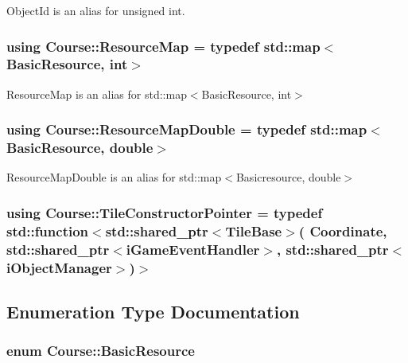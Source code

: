 Object\-Id is an alias for unsigned int. 

\hypertarget{namespaceCourse_ab9a46ed9cd00485e318e5731ea2f78d9}{
\subsubsection[{Resource\-Map}]{\setlength{\rightskip}{0pt plus 5cm}using {\bf Course\-::\-Resource\-Map} = typedef std\-::map$<${\bf Basic\-Resource}, int$>$}}\label{namespaceCourse_ab9a46ed9cd00485e318e5731ea2f78d9}


Resource\-Map is an alias for std\-::map$<$\-Basic\-Resource, int$>$ 

\hypertarget{namespaceCourse_a0b96bae1a664dde34efbb1b42dea615e}{
\subsubsection[{Resource\-Map\-Double}]{\setlength{\rightskip}{0pt plus 5cm}using {\bf Course\-::\-Resource\-Map\-Double} = typedef std\-::map$<${\bf Basic\-Resource}, double$>$}}\label{namespaceCourse_a0b96bae1a664dde34efbb1b42dea615e}


Resource\-Map\-Double is an alias for std\-::map$<$\-Basicresource, double$>$ 

\hypertarget{namespaceCourse_acf802ffd79a9573eb8afca22ae1f8a2f}{
\subsubsection[{Tile\-Constructor\-Pointer}]{\setlength{\rightskip}{0pt plus 5cm}using {\bf Course\-::\-Tile\-Constructor\-Pointer} = typedef std\-::function$<$std\-::shared\-\_\-ptr$<${\bf Tile\-Base}$>$( {\bf Coordinate}, std\-::shared\-\_\-ptr$<${\bf i\-Game\-Event\-Handler}$>$, std\-::shared\-\_\-ptr$<${\bf i\-Object\-Manager}$>$)$>$}}\label{namespaceCourse_acf802ffd79a9573eb8afca22ae1f8a2f}


\subsection{Enumeration Type Documentation}
\hypertarget{namespaceCourse_a02d49c04029594d4adba79b84bb85f65}{
\subsubsection[{Basic\-Resource}]{\setlength{\rightskip}{0pt plus 5cm}enum {\bf Course\-::\-Basic\-Resource}}}\label{namespaceCourse_a02d49c04029594d4adba79b84bb85f65}


